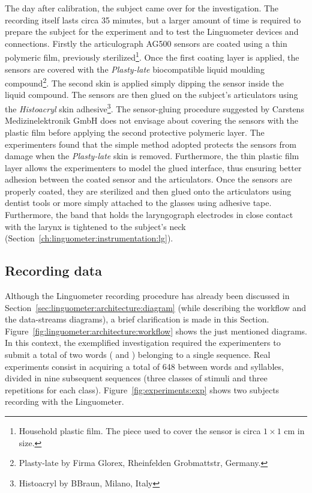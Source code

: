 
The day after calibration, the subject came over for the investigation.
The recording itself lasts circa 35 minutes, but a larger amount of time is
required to prepare the subject for the experiment and to test the Linguometer
devices and connections.
Firstly the articulograph AG500 sensors are coated using a thin polymeric 
film, previously sterilized\footnote{Household plastic film. The piece used
to cover the sensor is 
circa $1\times1$ cm in size.}. Once the first coating layer is applied, the 
sensors are covered with the \emph{Plasty-late} biocompatible liquid moulding 
compound\footnote{Plasty-late by Firma Glorex, Rheinfelden Grobmattstr, 
Germany.}. The second skin is applied simply dipping the sensor inside the
liquid compound.
The sensors are then glued on the subject's articulators using the
\emph{Histoacryl} skin adhesive\footnote{Histoacryl by BBraun, Milano, Italy}.
The sensor-gluing procedure suggested by Carstens Medizinelektronik GmbH does 
not envisage about covering the sensors with the plastic film before 
applying the second protective polymeric layer.
The experimenters found that the simple method adopted protects the sensors
from damage when the \emph{Plasty-late} skin is removed. Furthermore, the thin
plastic film layer allows the experimenters to model the glued interface,
thus ensuring better adhesion between the coated sensor and the articulators.
Once the sensors are properly coated, they are sterilized and then 
glued onto the articulators using dentist tools or more simply attached
to the glasses using adhesive tape.
Furthermore, the band that holds the laryngograph electrodes in close contact
with the larynx is tightened to the subject's neck
(Section~\ref{ch:linguometer:instrumentation:lg}).
\subsection{Recording data}
\label{sec:experiments:recording}
Although the Linguometer recording procedure has already been discussed in
Section~\ref{sec:linguometer:architecture:diagram} (while describing the 
workflow and the data-streams diagrams), a brief clarification is made in 
this Section. 
Figure~\ref{fig:linguometer:architecture:workflow} shows the just mentioned 
diagrams. In this context, the exemplified investigation required the
experimenters to submit a total of two words ( and ) 
belonging to a single sequence.
Real experiments consist in acquiring a total of 648 between words and
syllables, divided in nine subsequent sequences (three classes of stimuli and
three repetitions for each class).
Figure~\ref{fig:experiments:exp} shows two subjects recording with the
Linguometer.


